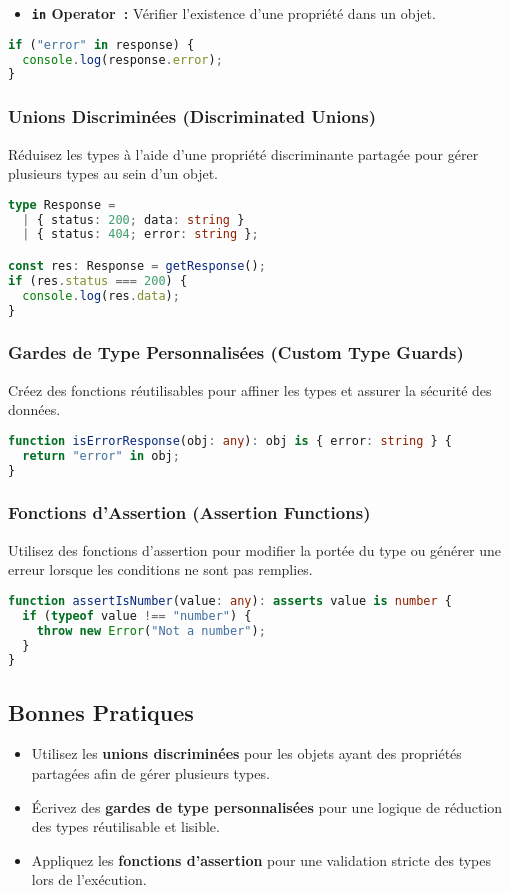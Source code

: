 \documentclass[a4paper,12pt]{article}
\begin{document}
\begin{itemize}
    \item \textbf{\texttt{in} Operator :} Vérifier l'existence d'une propriété dans un objet.
\end{itemize}
\begin{lstlisting}[language=TypeScript]
if ("error" in response) {
  console.log(response.error);
}
\end{lstlisting}
\subsubsection*{Unions Discriminées (Discriminated Unions)}
Réduisez les types à l'aide d'une propriété discriminante partagée pour gérer plusieurs types au sein d'un objet.

\begin{lstlisting}[language=TypeScript]
type Response =
  | { status: 200; data: string }
  | { status: 404; error: string };

const res: Response = getResponse();
if (res.status === 200) {
  console.log(res.data);
}
\end{lstlisting}

\subsubsection*{Gardes de Type Personnalisées (Custom Type Guards)}
Créez des fonctions réutilisables pour affiner les types et assurer la sécurité des données.

\begin{lstlisting}[language=TypeScript]
function isErrorResponse(obj: any): obj is { error: string } {
  return "error" in obj;
}
\end{lstlisting}

\subsubsection*{Fonctions d’Assertion (Assertion Functions)}
Utilisez des fonctions d'assertion pour modifier la portée du type ou générer une erreur lorsque les conditions ne sont pas remplies.

\begin{lstlisting}[language=TypeScript]
function assertIsNumber(value: any): asserts value is number {
  if (typeof value !== "number") {
    throw new Error("Not a number");
  }
}
\end{lstlisting}

\subsection*{Bonnes Pratiques}
\begin{itemize}
    \item Utilisez les \textbf{unions discriminées} pour les objets ayant des propriétés partagées afin de gérer plusieurs types.
    \item Écrivez des \textbf{gardes de type personnalisées} pour une logique de réduction des types réutilisable et lisible.
    \item Appliquez les \textbf{fonctions d’assertion} pour une validation stricte des types lors de l’exécution.
\end{itemize}
\end{document}
